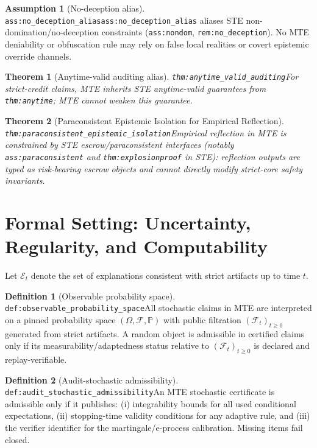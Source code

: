 \documentclass[11pt]{article}
\theoremstyle{definition}
\newtheorem{definition}{Definition}
\newtheorem{assumption}{Assumption}
\theoremstyle{plain}
\newtheorem{theorem}{Theorem}
\newcommand{\STE}{\textsf{STE}}
\newcommand{\MTE}{\textsf{MTE}}
\newcommand{\lbl}[1]{\texttt{\footnotesize\nolinkurl{#1}}}
\newcommand{\DefLabel}[1]{\hfill{\small\lbl{#1}}}
\newcommand{\Prob}{\mathbb{P}}
\newcommand{\Filtration}{(\mathcal{F}_t)_{t\ge 0}}
\newcommand{\Et}{\mathcal{E}_t}
\begin{document}
\begin{assumption}[No-deception alias]\DefLabel{ass:no_deception_alias}\label{ass:no_deception_alias}
\lbl{ass:no_deception_alias} aliases \STE{} non-domination/no-deception constraints
(\lbl{ass:nondom}, \lbl{rem:no_deception}).
No \MTE{} deniability or obfuscation rule may rely on false local realities or covert epistemic override channels.
\end{assumption}

\begin{theorem}[Anytime-valid auditing alias]\DefLabel{thm:anytime_valid_auditing}\label{thm:anytime_valid_auditing}
For strict-credit claims, \MTE{} inherits \STE{} anytime-valid guarantees from \lbl{thm:anytime}; \MTE{} cannot weaken this guarantee.
\end{theorem}

\begin{theorem}[Paraconsistent Epistemic Isolation for Empirical Reflection]\DefLabel{thm:paraconsistent_epistemic_isolation}\label{thm:paraconsistent_epistemic_isolation}
Empirical reflection in \MTE{} is constrained by \STE{} escrow/paraconsistent interfaces (notably \lbl{ass:paraconsistent} and \lbl{thm:explosionproof} in \STE{}): reflection outputs are typed as risk-bearing escrow objects and cannot directly modify strict-core safety invariants.
\end{theorem}
\section{Formal Setting: Uncertainty, Regularity, and Computability}\label{sec:formal}
Let $\Et$ denote the set of explanations consistent with strict artifacts up to time $t$.

\begin{definition}[Observable probability space]\DefLabel{def:observable_probability_space}\label{def:observable_probability_space}
All stochastic claims in \MTE{} are interpreted on a pinned probability space $(\Omega,\mathcal{F},\Prob)$ with public filtration $\Filtration$ generated from strict artifacts.
A random object is admissible in certified claims only if its measurability/adaptedness status relative to $\Filtration$ is declared and replay-verifiable.
\end{definition}

\begin{definition}[Audit-stochastic admissibility]\DefLabel{def:audit_stochastic_admissibility}\label{def:audit_stochastic_admissibility}
An \MTE{} stochastic certificate is admissible only if it publishes:
(i) integrability bounds for all used conditional expectations,
(ii) stopping-time validity conditions for any adaptive rule,
and (iii) the verifier identifier for the martingale/e-process calibration.
Missing items fail closed.
\end{definition}
\end{document}
